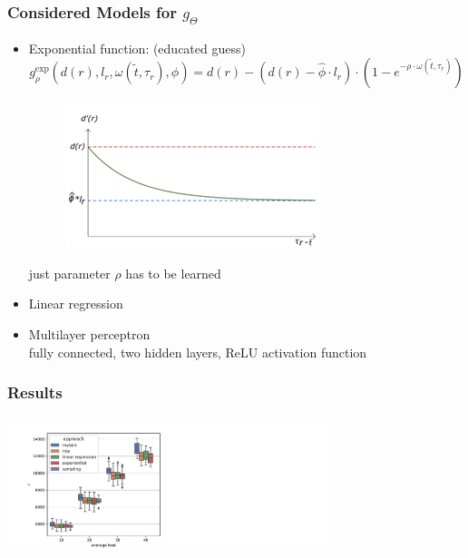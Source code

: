\documentclass[aspectratio=1610]{beamer}
\newcommand{\important}[1]{{\color{green!60!black}#1}}
\begin{document}
\begin{frame}
	\frametitle{Considered Models for $g_\Theta$}
	\begin{itemize}
		\itemsep2ex
		\item \important{Exponential function}: (educated guess) 
		\begin{equation*}
				g^\mathrm{exp}_\rho(d(r), l_r, \omega(\tilde t, \tau_r), \hat\phi) = d(r) - (d(r)-\hat\phi \cdot l_r) \cdot (1-e^{-\rho \cdot \omega(\tilde t, \tau_r)})
		\end{equation*}
		\vspace{-7mm}
		\begin{figure}[tb]
			\centering
			\includegraphics[width=.550\columnwidth]{graphics/exp-model.png}
		\end{figure}
		just parameter $\rho$ has to be learned
		\item \important{Linear regression}
		\item \important{Multilayer perceptron}\\
		fully connected, two hidden layers, ReLU activation function
	\end{itemize}
\end{frame}


\begin{frame}
	\frametitle{Results}
	\centering
	\includegraphics[width=0.7\textwidth]{graphics/boxplots.pdf}
\end{frame}
\end{document}
